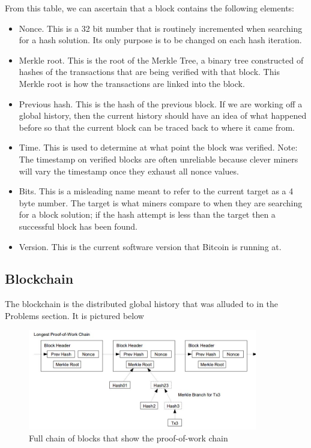 \documentclass[pdftex,11pt]{article}
\begin{document}
From this table, we can ascertain that a block contains the following elements:
\begin{itemize}
	\item Nonce. This is a 32 bit number that is routinely incremented when searching for a hash solution. Its only purpose is to be changed on each hash iteration.
	\item Merkle root. This is the root of the Merkle Tree, a binary tree constructed of hashes of the transactions that are being verified with that block. This Merkle root is how the transactions are linked into the block.
	\item Previous hash. This is the hash of the previous block. If we are working off a global history, then the current history should have an idea of what happened before so that the current block can be traced back to where it came from.
	\item Time. This is used to determine at what point the block was verified. Note: The timestamp on verified blocks are often unreliable because clever miners will vary the timestamp once they exhaust all nonce values.
	\item Bits. This is a misleading name meant to refer to the current target as a 4 byte number. The target is what miners compare to when they are searching for a block solution; if the hash attempt is less than the target then a successful block has been found.
	\item Version. This is the current software version that Bitcoin is running at.
\end{itemize}

\subsection{Blockchain}
The blockchain is the distributed global history that was alluded to in the Problems section. It is pictured below

\begin{figure}[H]
	\centering
	\includegraphics[width=100mm]{figures/blockchain.jpg}
	\caption{Full chain of blocks that show the proof-of-work chain}
	\label{blockchain}
\end{figure}
\end{document}
